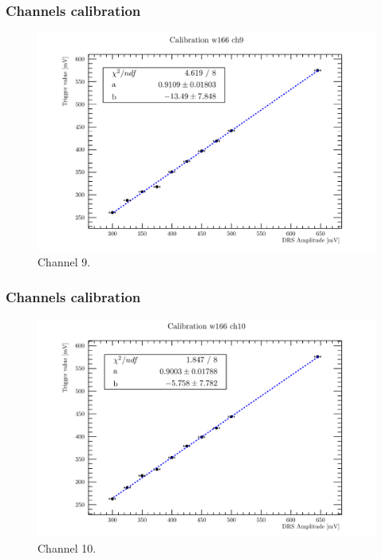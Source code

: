 \documentclass[9pt]{beamer}
\begin{document}

\begin{frame} [fragile]
\small
	\frametitle{Channels calibration}
    		\begin{figure}
		 \centering
			\includegraphics[scale=0.5]{figures/ch9.pdf}
			\caption{Channel 9.}
		\end{figure}  
\end{frame}


\begin{frame} [fragile]
\small
	\frametitle{Channels calibration}
    		\begin{figure}
		 \centering
			\includegraphics[scale=0.5]{figures/ch10.pdf}
			\caption{Channel 10.}
		\end{figure}  
\end{frame}
\end{document}
